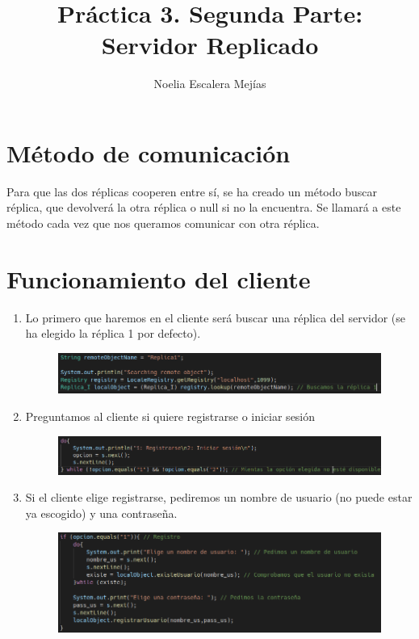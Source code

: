 \documentclass{article}
\title{Práctica 3. Segunda Parte: Servidor Replicado}
\author{Noelia Escalera Mejías}
\begin{document}
	\maketitle
	\section{Método de comunicación}
	Para que las dos réplicas cooperen entre sí, se ha creado un método buscar réplica, que devolverá la otra réplica o null si no la encuentra. Se llamará a este método cada vez que nos queramos comunicar con otra réplica.
	\section{Funcionamiento del cliente}
	\begin{enumerate}
		\item Lo primero que haremos en el cliente será buscar una réplica del servidor (se ha elegido la réplica 1 por defecto).
		\begin{figure}[H]
			\centering
			\includegraphics[totalheight=1.55cm]{img/1.png}
		\end{figure}
		\item Preguntamos al cliente si quiere registrarse o iniciar sesión
		\begin{figure}[H]
			\centering
			\includegraphics[totalheight=1.5cm]{img/2.png}
		\end{figure}
		\item Si el cliente elige registrarse, pediremos un nombre de usuario (no puede estar ya escogido) y una contraseña.
		\begin{figure}[H]
			\centering
			\includegraphics[totalheight=3.85cm]{img/3.png}

\end{figure}
\end{enumerate}
\end{document}
